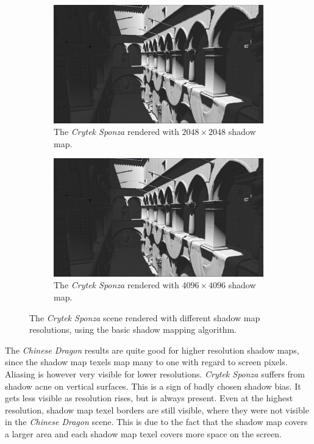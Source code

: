 \begin{figure}[t]
    \begin{subfigure}{0.48\textwidth}
		\centering
        \includegraphics[width=\textwidth]{./graf/tests/basic/cropped/sponza_basic_fhd_2048.png}
        \caption{The \textit{Crytek Sponza} rendered with \(2048\times 2048\) shadow map.}
    \end{subfigure}
	\hfill
    \begin{subfigure}{0.48\textwidth}
		\centering
        \includegraphics[width=\textwidth]{./graf/tests/basic/cropped/sponza_basic_fhd_4096.png}
        \caption{The \textit{Crytek Sponza} rendered with \(4096\times 4096\) shadow map.}
    \end{subfigure}

    \caption{The \textit{Crytek Sponza} scene rendered with different shadow map resolutions, using the basic shadow mapping algorithm.}
    \label{fig:test_basic_sponza_screens}
\end{figure}

The \textit{Chinese Dragon} results are quite good for higher resolution shadow maps, since the shadow map texels map many to one with regard to screen pixels. Aliasing is however very visible for lower resolutions. \textit{Crytek Sponza} suffers from shadow acne on vertical surfaces. This is a sign of badly chosen shadow bias. It gets less visible as resolution rises, but is always present. Even at the highest resolution, shadow map texel borders are still visible, where they were not visible in the \textit{Chinese Dragon} scene. This is due to the fact that the shadow map covers a larger area and each shadow map texel covers more space on the screen.

